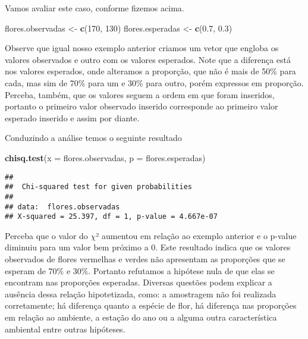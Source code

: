 \documentclass[titlepage, oneside, openany, a4paper]{book}
\newenvironment{Shaded}{\begin{snugshade}}{\end{snugshade}}
\newcommand{\DataTypeTok}[1]{\textcolor[rgb]{0.13,0.29,0.53}{#1}}
\newcommand{\DecValTok}[1]{\textcolor[rgb]{0.00,0.00,0.81}{#1}}
\newcommand{\FloatTok}[1]{\textcolor[rgb]{0.00,0.00,0.81}{#1}}
\newcommand{\KeywordTok}[1]{\textcolor[rgb]{0.13,0.29,0.53}{\textbf{#1}}}
\newcommand{\NormalTok}[1]{#1}
\newcommand{\StringTok}[1]{\textcolor[rgb]{0.31,0.60,0.02}{#1}}
\begin{document}
Vamos avaliar este caso, conforme fizemos acima.

\begin{Shaded}
\begin{Highlighting}[]
\NormalTok{flores.observadas <-}\StringTok{ }\KeywordTok{c}\NormalTok{(}\DecValTok{170}\NormalTok{, }\DecValTok{130}\NormalTok{)}
\NormalTok{flores.esperadas <-}\StringTok{ }\KeywordTok{c}\NormalTok{(}\FloatTok{0.7}\NormalTok{, }\FloatTok{0.3}\NormalTok{)}
\end{Highlighting}
\end{Shaded}

Observe que igual nosso exemplo anterior criamos um vetor que engloba os valores observados e outro com os valores esperados. Note que a diferença está nos valores esperados, onde alteramos a proporção, que não é mais de 50\% para cada, mas sim de 70\% para um e 30\% para outro, porém expressos em proporção. Perceba, também, que os valores seguem a ordem em que foram inseridos, portanto o primeiro valor observado inserido corresponde ao primeiro valor esperado inserido e assim por diante.

Conduzindo a análise temos o seguinte resultado

\begin{Shaded}
\begin{Highlighting}[]
\KeywordTok{chisq.test}\NormalTok{(}\DataTypeTok{x =}\NormalTok{ flores.observadas, }\DataTypeTok{p =}\NormalTok{ flores.esperadas)}
\end{Highlighting}
\end{Shaded}

\begin{verbatim}
## 
##  Chi-squared test for given probabilities
## 
## data:  flores.observadas
## X-squared = 25.397, df = 1, p-value = 4.667e-07
\end{verbatim}

Perceba que o valor do \(\chi\)² aumentou em relação ao exemplo anterior e o p-value diminuiu para um valor bem próximo a 0. Este resultado indica que os valores observados de flores vermelhas e verdes não apresentam as proporções que se esperam de 70\% e 30\%. Portanto refutamos a hipótese nula de que elas se encontram nas proporções esperadas. Diversas questões podem explicar a ausência dessa relação hipotetizada, como: a amostragem não foi realizada corretamente; há diferença quanto a espécie de flor, há diferença nas proporções em relação ao ambiente, a estação do ano ou a alguma outra característica ambiental entre outras hipóteses.
\end{document}
